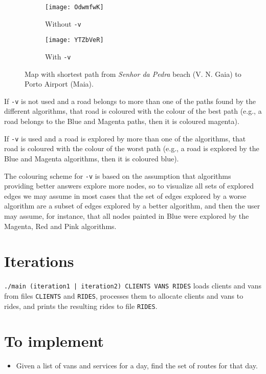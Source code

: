 \begin{figure}[h]
    \centering
    \begin{subfigure}{.49\textwidth}
        \centering
        \texttt{[image: OdwmfwK]}
        \caption{Without \texttt{-v}}
    \end{subfigure}
    \begin{subfigure}{.49\textwidth}
        \centering
        \texttt{[image: YTZbVeR]}
        \caption{With \texttt{-v}}
    \end{subfigure}
    \caption{Map with shortest path from \textit{Senhor da Pedra} beach (V. N. Gaia) to Porto Airport (Maia).}
\end{figure}

If \texttt{-v} is not used and a road belongs to more than one of the paths found by the different algorithms, that road is coloured with the colour of the best path (e.g., a road belongs to the Blue and Magenta paths, then it is coloured magenta).\par
If \texttt{-v} is used and a road is explored by more than one of the algorithms, that road is coloured with the colour of the worst path (e.g., a road is explored by the Blue and Magenta algorithms, then it is coloured blue).\par
The colouring scheme for \texttt{-v} is based on the assumption that algorithms providing better answers explore more nodes, so to visualize all sets of explored edges we may assume in most cases that the set of edges explored by a worse algorithm are a subset of edges explored by a better algorithm, and then the user may assume, for instance, that all nodes painted in Blue were explored by the Magenta, Red and Pink algorithms.

\section{Iterations}
\texttt{./main (iteration1 | iteration2) CLIENTS VANS RIDES} loads clients and vans from files \texttt{CLIENTS} and \texttt{RIDES}, processes them to allocate clients and vans to rides, and prints the resulting rides to file \texttt{RIDES}. 

\section{To implement}
\begin{itemize}
    \item Given a list of vans and services for a day, find the set of routes for that day.
\end{itemize}
